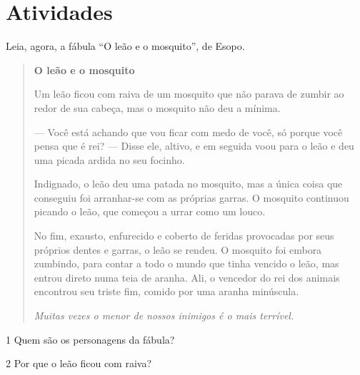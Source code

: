 \section{Atividades}

Leia, agora, a fábula ``O leão e o mosquito'', de Esopo.


\begin{quote}
\textbf{O leão e o mosquito}

Um leão ficou com raiva de um mosquito que não parava de zumbir ao redor
de sua cabeça, mas o mosquito não deu a mínima.

--- Você está achando que vou ficar com medo de você, só porque você
pensa que é rei? --- Disse ele, altivo, e em seguida voou para o leão e
deu uma picada ardida no seu focinho.

Indignado, o leão deu uma patada no mosquito, mas a única coisa que
conseguiu foi arranhar-se com as próprias garras. O mosquito continuou
picando o leão, que começou a urrar como um louco.

No fim, exausto, enfurecido e
coberto de feridas provocadas por seus próprios dentes e garras, o leão
se rendeu. O mosquito foi embora zumbindo, para contar a todo o mundo que
tinha vencido o leão, mas entrou direto numa teia de aranha. Ali, o
vencedor do rei dos animais encontrou seu triste fim, comido por uma
aranha minúscula.

\emph{Muitas vezes o menor de nossos inimigos é o mais terrível.}

\end{quote}

\num{1} Quem são os personagens da fábula?


\num{2} Por que o leão ficou com raiva?

